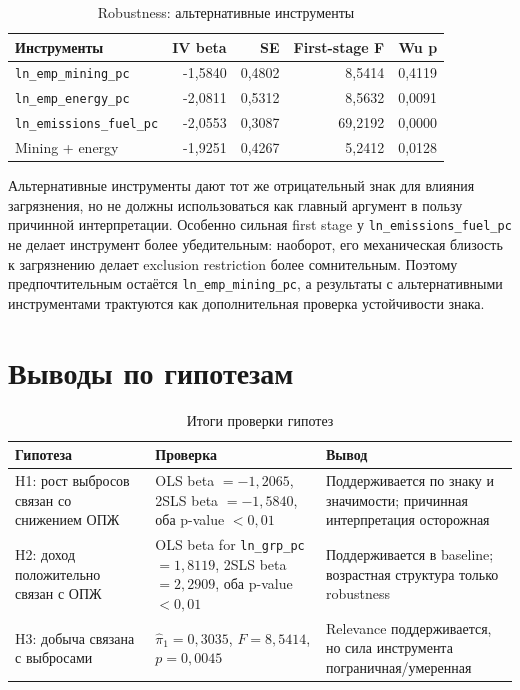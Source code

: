 \documentclass[10pt,a4paper]{article}
\begin{document}
\begin{table}[H]
\centering
\caption{Robustness: альтернативные инструменты}
\label{tab:alt_iv}
\begin{tabular}{lrrrr}
\toprule
\textbf{Инструменты} & \textbf{IV beta} & \textbf{SE} & \textbf{First-stage F} & \textbf{Wu p} \\
\midrule
\texttt{ln\_emp\_mining\_pc} & -1{,}5840 & 0{,}4802 & 8{,}5414 & 0{,}4119 \\
\texttt{ln\_emp\_energy\_pc} & -2{,}0811 & 0{,}5312 & 8{,}5632 & 0{,}0091 \\
\texttt{ln\_emissions\_fuel\_pc} & -2{,}0553 & 0{,}3087 & 69{,}2192 & 0{,}0000 \\
Mining + energy & -1{,}9251 & 0{,}4267 & 5{,}2412 & 0{,}0128 \\
\bottomrule
\end{tabular}
\end{table}

Альтернативные инструменты дают тот же отрицательный знак для влияния загрязнения, но не должны использоваться как главный аргумент в пользу причинной интерпретации. Особенно сильная first stage у \texttt{ln\_emissions\_fuel\_pc} не делает инструмент более убедительным: наоборот, его механическая близость к загрязнению делает exclusion restriction более сомнительным. Поэтому предпочтительным остаётся \texttt{ln\_emp\_mining\_pc}, а результаты с альтернативными инструментами трактуются как дополнительная проверка устойчивости знака.

\section{Выводы по гипотезам}

\begin{table}[H]
\centering
\caption{Итоги проверки гипотез}
\label{tab:hypotheses}
\begin{tabular}{p{}p{}p{}}
\toprule
\textbf{Гипотеза} & \textbf{Проверка} & \textbf{Вывод} \\
\midrule
H1: рост выбросов связан со снижением ОПЖ & OLS beta $=-1{,}2065$, 2SLS beta $=-1{,}5840$, оба p-value $<0{,}01$ & Поддерживается по знаку и значимости; причинная интерпретация осторожная \\
H2: доход положительно связан с ОПЖ & OLS beta for \texttt{ln\_grp\_pc} $=1{,}8119$, 2SLS beta $=2{,}2909$, оба p-value $<0{,}01$ & Поддерживается в baseline; возрастная структура только robustness \\
H3: добыча связана с выбросами & $\hat\pi_1=0{,}3035$, $F=8{,}5414$, $p=0{,}0045$ & Relevance поддерживается, но сила инструмента пограничная/умеренная \\
\bottomrule
\end{tabular}
\end{table}
\end{document}
